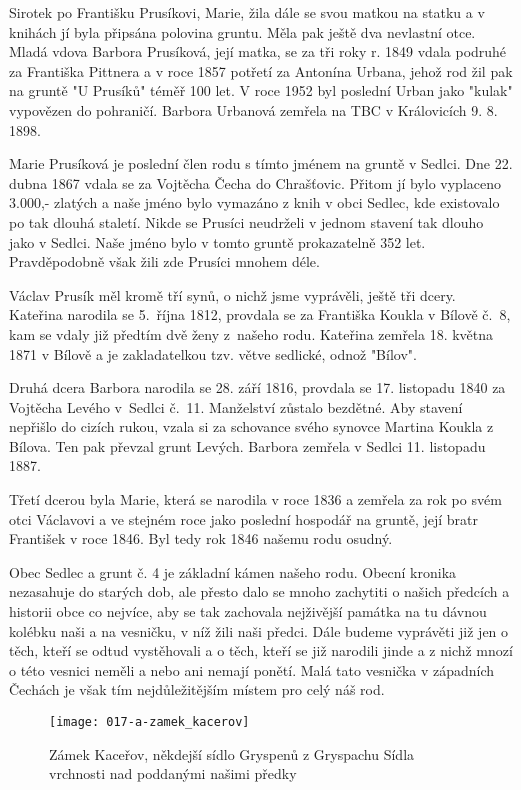 \documentclass[../dejiny-rodu-prusiku.tex]{subfiles}
\begin{document}
Sirotek po Františku Prusíkovi, Marie, žila dále se svou matkou na statku a v knihách jí byla připsána po­lovina gruntu. Měla pak ještě dva nevlastní otce. Mladá vdova Barbora Prusíková, její matka, se za tři roky r. 1849 vdala podruhé za Františka Pittnera a v roce 1857 potřetí za Antonína Urbana, jehož rod žil pak na gruntě "U Prusíků" téměř 100 let. V roce 1952 byl poslední Urban jako "kulak" vypovězen do pohraničí. Barbora Urbanová zemřela na TBC v Královicích 9. 8. 1898.

Marie Prusíková je poslední člen rodu s tímto jménem na gruntě v Sedlci. Dne 22. dubna 1867 vdala se za Vojtěcha Čecha do Chrašťovic. Přitom jí bylo vyplace­no 3.000,- zlatých a naše jméno bylo vymazáno z knih v obci Sedlec, kde existovalo po tak dlouhá staletí. Nikde se Prusíci neudrželi v jednom stavení tak dlouho jako v Sedlci. Naše jméno bylo v tomto gruntě prokaza­telně 352 let. Pravděpodobně však žili zde Prusíci mnohem déle.

Václav Prusík měl kromě tří synů, o nichž jsme vyprávěli, ještě tři dcery. Kateřina narodila se 5.~října 1812, provdala se za Františka Koukla v Bílově č.~8, kam se vdaly již předtím dvě ženy z~našeho rodu. Kateřina zemřela 18. května 1871 v Bílově a je zakladatelkou tzv. větve sedlické, odnož "Bílov".

Druhá dcera Barbora narodila se 28. září 1816, provdala se 17. listopadu 1840 za Vojtěcha Levého v~Sedlci č.~11. Manželství zůstalo bezdětné. Aby stavení nepřišlo do cizích rukou, vzala si za schovance svého synovce Martina Koukla z Bílova. Ten pak převzal grunt Levých. Barbora zemřela v Sedlci 11. listopadu 1887.

Třetí dcerou byla Marie, která se narodila v roce 1836 a zemřela za rok po svém otci Václavovi a ve stejném roce jako poslední hospodář na gruntě, její bratr Fran­tišek v roce 1846. Byl tedy rok 1846 našemu rodu osudný.

Obec Sedlec a grunt č. 4 je základní kámen našeho rodu. Obecní kronika nezasahuje do starých dob, ale přesto dalo se mnoho zachytiti o našich předcích a historii obce co nejvíce, aby se tak zachovala nejživější památka na tu dávnou kolébku naši a na vesničku, v níž žili na­ši předci. Dále budeme vyprávěti již jen o těch, kteří se odtud vystěhovali a o těch, kteří se již narodili jinde a z nichž mnozí o této vesnici neměli a nebo ani nemají ponětí. Malá tato vesnička v západních Čechách je však tím nejdůležitějším místem pro celý náš rod.

\begin{figure}
\centering
\texttt{[image: 017-a-zamek\_kacerov]}
\caption{Zámek Kaceřov, někdejší sídlo Gryspenů z Gryspachu
Sídla vrchnosti nad poddanými našimi předky}
\label{fig:017-a-zamek_kacerov}
\end{figure}
\end{document}
